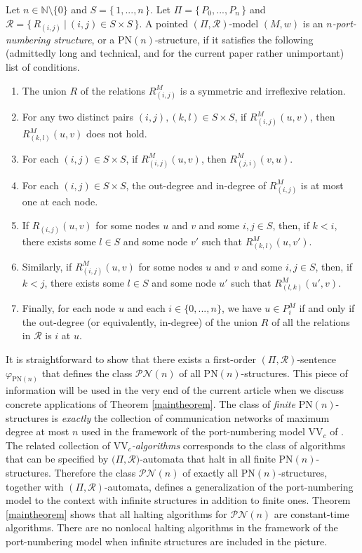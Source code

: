 \documentclass[copyright,creativecommons]{eptcs}
\begin{document}
Let $n\in\mathbb{N}\setminus\{0\}$ and $S = \{\, 1,...,n\, \}$.
Let $\Pi = \{\, P_0,...,P_n\, \}$ and $\mathcal{R} = \{\, R_{(i,j)}\ |\ (i,j)\in S\times S\, \}$.
A pointed $(\Pi,\mathcal{R})$-model $(M,w)$ is an \emph{$n$-port-numbering structure}, or a $\mathrm{PN}(n)$-structure,
if it satisfies the following (admittedly long and technical, and for the 
current paper rather unimportant) list of conditions.
\begin{enumerate}
\item
The union $R$ of the relations $R_{(i,j)}^M$ is a symmetric and irreflexive
relation.
\item
For any two distinct pairs $(i,j),(k,l)\in S\times S$, if $R_{(i,j)}^M(u,v)$, then $R_{(k,l)}^M(u,v)$ does not hold.
\item
For each $(i,j)\in S\times S$, if $R_{(i,j)}^M(u,v)$, then $R_{(j,i)}^M(v,u)$.
\item
For each $(i,j)\in S\times S$, the out-degree and in-degree of $R_{(i,j)}^M$ is at most one at each node.
\item
If $R_{(i,j)}(u,v)$ for some nodes $u$ and $v$ and some $i,j\in S$,
then, if $k<i$, there exists some $l\in S$ and some node $v'$ such that $R_{(k,l)}^M(u,v')$.
\item
Similarly, if $R_{(i,j)}^M(u,v)$ for some nodes $u$ and $v$ and some $i,j\in S$,
then, if $k<j$, there exists some $l\in S$ and some node $u'$ such that $R_{(l,k)}^M(u',v)$. 
\item
Finally, for each node $u$ and each $i\in \{0,...,n\}$, we have $u\in P_i^M$ if and only if the out-degree
(or equivalently, in-degree) of the union $R$ of all the relations in $\mathcal{R}$ is $i$ at $u$.
\end{enumerate}




It is straightforward to show that there exists a first-order $(\Pi,\mathcal{R})$-sentence
$\varphi_{\mathrm{PN}(n)}$ that defines the class $\mathcal{PN}(n)$ of all $\mathrm{PN}(n)$-structures.
This piece of information will be used in the very end of the current article when
we discuss concrete applications of Theorem \ref{maintheorem}\hspace{0.4mm}.
The class of \emph{finite}
$\mathrm{PN}(n)$-structures is \emph{exactly} the collection of communication networks of
maximum degree at most $n$ used in the framework of 
the port-numbering model $\mathrm{VV}_c$ of \cite{hella, hella2}.
The related collection of \emph{$\mathrm{VV}_c$-algorithms}
corresponds to the class of algorithms that can be specified by $\mathrm(\Pi,\mathcal{R})$-automata
that halt in all finite $\mathrm{PN}(n)$-structures.
Therefore the class $\mathcal{PN}(n)$ of 
exactly all $\mathrm{PN}(n)$-structures, together with $(\Pi,\mathcal{R})$-automata, defines a
generalization of the port-numbering model to the context with infinite structures in addition to
finite ones. Theorem \ref{maintheorem} shows that all halting algorithms for $\mathcal{PN}(n)$
are constant-time algorithms.
There are no nonlocal halting algorithms in the framework of the port-numbering model when infinite structures are
included in the picture.
\end{document}
